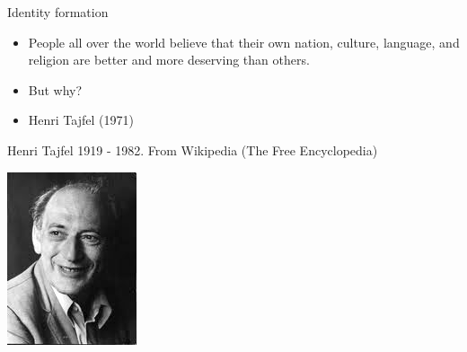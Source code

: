 \documentclass[
  ignorenonframetext,
  aspectratio=169,
]{beamer}
\providecommand{\tightlist}{%
  \setlength{\itemsep}{0pt}\setlength{\parskip}{0pt}}\usepackage{longtable,booktabs,array}
\begin{document}
\begin{frame}{Identity formation}
\label{identity-formation}
\begin{itemize}[<+->]
\tightlist
\item
  People all over the world believe that their own nation, culture,
  language, and religion are better and more deserving than others.
\item
  But why?
\item
  Henri Tajfel (1971)
\end{itemize}
\end{frame}

\begin{frame}
Henri Tajfel 1919 - 1982. From Wikipedia (The Free Encyclopedia)

\begin{center}
\includegraphics{figs/Henri_Tajfel.jpg}
\end{center}
\end{frame}
\end{document}
